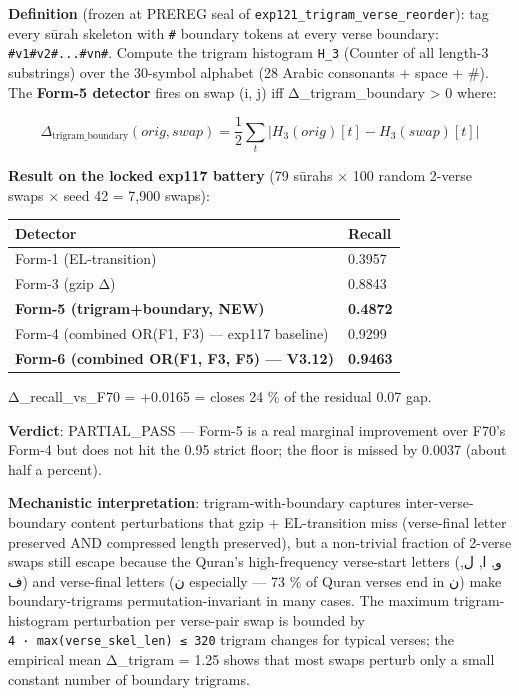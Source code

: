 \documentclass[
]{article}
\newcounter{none} %
\begin{document}
\textbf{Definition} (frozen at PREREG seal of
\texttt{exp121\_trigram\_verse\_reorder}): tag every sūrah skeleton with
\texttt{\#} boundary tokens at every verse boundary:
\texttt{\#v1\#v2\#...\#vn\#}. Compute the trigram histogram
\texttt{H\_3} (Counter of all length-3 substrings) over the 30-symbol
alphabet (28 Arabic consonants + space + \#). The \textbf{Form-5
detector} fires on swap (i, j) iff Δ\_trigram\_boundary \textgreater{} 0
where:

\[\Delta_{\text{trigram\_boundary}}(orig, swap) = \frac{1}{2} \sum_t |H_3(orig)[t] - H_3(swap)[t]|\]

\textbf{Result on the locked exp117 battery} (79 sūrahs × 100 random
2-verse swaps × seed 42 = 7,900 swaps):

{\def\LTcaptype{none} %
\begin{longtable}[]{@{}ll@{}}
\toprule\noalign{}
Detector & Recall \\
\midrule\noalign{}
\endhead
\bottomrule\noalign{}
\endlastfoot
Form-1 (EL-transition) & 0.3957 \\
Form-3 (gzip Δ) & 0.8843 \\
\textbf{Form-5 (trigram+boundary, NEW)} & \textbf{0.4872} \\
Form-4 (combined OR(F1, F3) --- exp117 baseline) & 0.9299 \\
\textbf{Form-6 (combined OR(F1, F3, F5) --- V3.12)} & \textbf{0.9463} \\
\end{longtable}
}

Δ\_recall\_vs\_F70 = +0.0165 = closes 24 \% of the residual 0.07 gap.

\textbf{Verdict}: PARTIAL\_PASS --- Form-5 is a real marginal
improvement over F70's Form-4 but does not hit the 0.95 strict floor;
the floor is missed by 0.0037 (about half a percent).

\textbf{Mechanistic interpretation}: trigram-with-boundary captures
inter-verse-boundary content perturbations that gzip + EL-transition
miss (verse-final letter preserved AND compressed length preserved), but
a non-trivial fraction of 2-verse swaps still escape because the Quran's
high-frequency verse-start letters (و, ا, ل, ف) and verse-final letters
(ن especially --- 73 \% of Quran verses end in ن) make boundary-trigrams
permutation-invariant in many cases. The maximum trigram-histogram
perturbation per verse-pair swap is bounded by
\texttt{4\ ·\ max(verse\_skel\_len)\ ≤\ 320} trigram changes for typical
verses; the empirical mean Δ\_trigram = 1.25 shows that most swaps
perturb only a small constant number of boundary trigrams.
\end{document}
